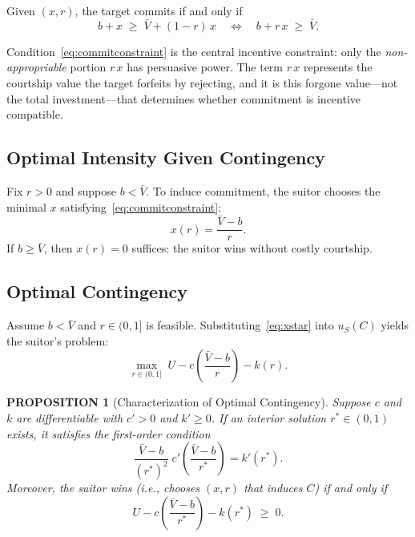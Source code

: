 \documentclass[AER]{AEA}
\newtheorem{proposition}{PROPOSITION}
\begin{document}
Given $(x,r)$, the target commits if and only if
\begin{equation}\label{eq:commitconstraint}
b + x \;\ge\; \bar{V} + (1-r)\,x
\quad \Longleftrightarrow \quad
b + r\,x \;\ge\; \bar{V}.
\end{equation}

Condition~\eqref{eq:commitconstraint} is the central incentive constraint: only the \emph{non-appropriable} portion $r\,x$ has persuasive power.
The term $r\,x$ represents the courtship value the target forfeits by rejecting, and it is this forgone value---not the total investment---that determines whether commitment is incentive compatible.

\subsection{Optimal Intensity Given Contingency}

Fix $r>0$ and suppose $b<\bar{V}$.
To induce commitment, the suitor chooses the minimal $x$ satisfying~\eqref{eq:commitconstraint}:
\begin{equation}\label{eq:xstar}
x(r) = \frac{\bar{V}-b}{r}.
\end{equation}
If $b\ge \bar{V}$, then $x(r)=0$ suffices: the suitor wins without costly courtship.

\subsection{Optimal Contingency}

Assume $b<\bar{V}$ and $r\in(0,1]$ is feasible.
Substituting~\eqref{eq:xstar} into $u_S(C)$ yields the suitor's problem:
\begin{equation}\label{eq:rsproblem}
\max_{r\in(0,1]} \;
U - c\!\left(\frac{\bar{V}-b}{r}\right) - k(r).
\end{equation}

\begin{proposition}[Characterization of Optimal Contingency]\label{prop:optcontingency}
Suppose $c$ and $k$ are differentiable with $c'>0$ and $k'\ge 0$.
If an interior solution $r^*\in(0,1)$ exists, it satisfies the first-order condition
\begin{equation}\label{eq:foc}
\frac{\bar{V}-b}{(r^*)^2}\;c'\!\left(\frac{\bar{V}-b}{r^*}\right) = k'(r^*).
\end{equation}
Moreover, the suitor wins (i.e., chooses $(x,r)$ that induces $C$) if and only if
\begin{equation}\label{eq:participation}
U - c\!\left(\frac{\bar{V}-b}{r^*}\right) - k(r^*) \;\ge\; 0.
\end{equation}
\end{proposition}
\end{document}
